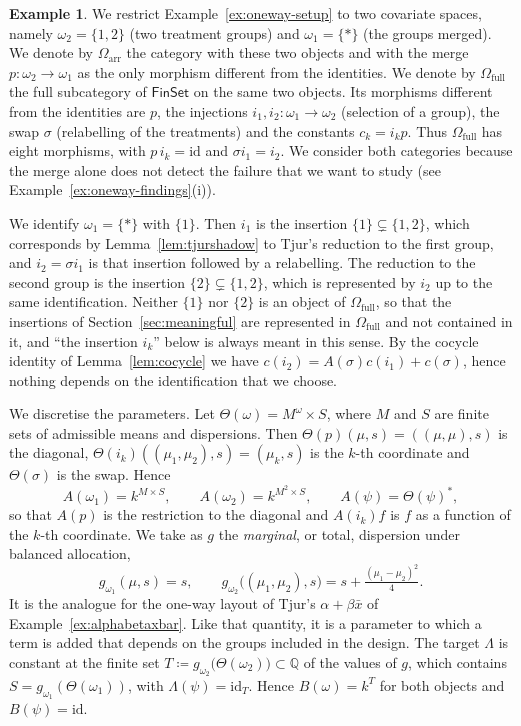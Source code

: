 \documentclass[11pt,a4paper]{article}
\theoremstyle{plain}
\theoremstyle{definition}
\newtheorem{example}[theorem]{Example}
\theoremstyle{remark}
\newcommand{\cat}[1]{\mathsf{#1}}
\newcommand{\catO}{\cat{\Omega}}
\newcommand{\FinSet}{\cat{FinSet}}
\newcommand{\id}{\mathrm{id}}
\begin{document}
\begin{example}\label{ex:oneway}
We restrict Example~\ref{ex:oneway-setup} to two covariate spaces, namely
$\omega_2 = \{1,2\}$ (two treatment groups) and $\omega_1 = \{*\}$ (the groups
merged). We denote by $\catO_{\mathrm{arr}}$ the category with these two
objects and with the merge $p \colon \omega_2 \to \omega_1$ as the only
morphism different from the identities. We denote by $\catO_{\mathrm{full}}$
the full subcategory of $\FinSet$ on the same two objects. Its morphisms
different from the identities are $p$, the injections
$i_1, i_2 \colon \omega_1 \to \omega_2$ (selection of a group), the swap
$\sigma$ (relabelling of the treatments) and the constants $c_k = i_k p$. Thus
$\catO_{\mathrm{full}}$ has eight morphisms, with $p\,i_k = \id$ and
$\sigma i_1 = i_2$. We consider both categories because the merge alone does
not detect the failure that we want to study (see
Example~\ref{ex:oneway-findings}(i)).

We identify $\omega_1 = \{*\}$ with $\{1\}$. Then $i_1$ is the insertion
$\{1\} \subsetneq \{1,2\}$, which corresponds by
Lemma~\ref{lem:tjurshadow} to Tjur's reduction to the first group, and
$i_2 = \sigma i_1$ is that insertion followed by a relabelling. The reduction
to the second group is the insertion $\{2\} \subsetneq \{1,2\}$, which is
represented by $i_2$ up to the same identification. Neither $\{1\}$ nor
$\{2\}$ is an object of $\catO_{\mathrm{full}}$, so that the insertions of
Section~\ref{sec:meaningful} are represented in $\catO_{\mathrm{full}}$ and
not contained in it, and ``the insertion $i_k$'' below is always meant in
this sense. By the cocycle identity of Lemma~\ref{lem:cocycle} we have
$c(i_2) = A(\sigma)c(i_1) + c(\sigma)$, hence nothing depends on the
identification that we choose.

We discretise the parameters. Let $\Theta(\omega) = M^{\omega} \times S$, where
$M$ and $S$ are finite sets of admissible means and dispersions. Then
$\Theta(p)(\mu,s) = ((\mu,\mu),s)$ is the diagonal,
$\Theta(i_k)((\mu_1,\mu_2),s) = (\mu_k,s)$ is the $k$-th coordinate and
$\Theta(\sigma)$ is the swap. Hence
\[
A(\omega_1) = k^{M \times S}, \qquad
A(\omega_2) = k^{M^{2} \times S}, \qquad
A(\psi) = \Theta(\psi)^{*},
\]
so that $A(p)$ is the restriction to the diagonal and $A(i_k)f$ is $f$ as a
function of the $k$-th coordinate. We take as $g$ the \emph{marginal}, or
total, dispersion under balanced allocation,
\[
g_{\omega_1}(\mu,s) = s,
\qquad
g_{\omega_2}\bigl((\mu_1,\mu_2),s\bigr) = s + \tfrac{(\mu_1-\mu_2)^2}{4}.
\]
It is the analogue for the one-way layout of Tjur's $\alpha + \beta\bar x$ of
Example~\ref{ex:alphabetaxbar}. Like that quantity, it is a parameter to which
a term is added that depends on the groups included in the design. The target
$\Lambda$ is constant at the finite set
$T \coloneqq g_{\omega_2}\bigl(\Theta(\omega_2)\bigr) \subset \mathbb{Q}$ of
the values of $g$, which contains $S = g_{\omega_1}(\Theta(\omega_1))$, with
$\Lambda(\psi) = \id_{T}$. Hence $B(\omega) = k^{T}$ for both objects and
$B(\psi) = \id$.


\end{example}
\end{document}
